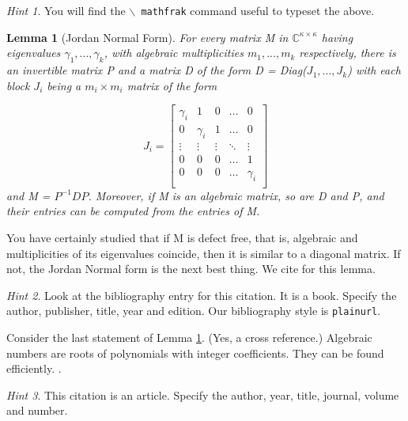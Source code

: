 \documentclass[]{article}
\newtheorem{lemma}{Lemma}
\theoremstyle{remark}
\newtheorem*{hint}{Hint}
\begin{document}
\begin{hint}
You will find the \texttt{$\backslash$ \hspace{-0.5 em}mathfrak} command useful to typeset the above.
\end{hint}

\begin{lemma}[Jordan Normal Form]\label{lemma1}
For every matrix M in $\mathbb{C}^{\kappa \times \kappa}$ having eigenvalues $\gamma_1, ..., \gamma_k$, with algebraic multiplicities $m_1, ..., m_k$ respectively, there is an invertible matrix P and a matrix D of the form D = Diag($J_1, ...,J_k$) with each block $J_i$ being a $m_i \times m_i$ matrix of the form

\vspace{-1 em}
\begin{equation*}
    J_i = 
    \begin{bmatrix} 
        \gamma_i & 1 & 0 & \dots & 0 \\
        0 & \gamma_i & 1 & \dots & 0 \\
        \vdots & \vdots & \vdots & \ddots & \vdots \\
        0 & 0 & 0 & \dots & 1 \\
        0 & 0 & 0 & \dots & \gamma_i \\
    \end{bmatrix}
\end{equation*}
\vspace{0.2 em}
and M = $P^{-1}DP$. Moreover, if M is an algebraic matrix, so are D and P, and their entries can be computed from the entries of M.
\end{lemma}

You have certainly studied that if M is defect free, that is, algebraic and multiplicities of its eigenvalues coincide, then it is similar to a diagonal matrix. If not, the Jordan Normal form is the next best thing. We cite \cite{ref1} for this lemma.

\begin{hint}
Look at the bibliography entry for this citation. It is a book. Specify the author, publisher, title, year and edition. Our bibliography style is
\texttt{plainurl}.
\end{hint}

Consider the last statement of Lemma \ref{lemma1}. (Yes, a cross reference.) Algebraic numbers are roots of polynomials with integer coefficients. They can be found efficiently. \cite{ref2}.

\begin{hint}
This citation is an article. Specify the author, year, title, journal, volume and number.
\end{hint}

\end{document}
